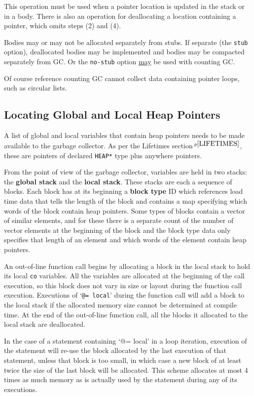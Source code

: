 \documentclass[12pt]{article}
\newcommand{\key}[1]{{\rm \bfseries #1}}
\newcommand{\pagnote}[1]{$\,^{p\pageref{#1}}$}
\begin{document}
This operation must be used when a pointer location is updated
in the stack or in a body.  There is also an operation for
deallocating a location containing a pointer, which omits steps
(2) and (4).

Bodies may or may not be allocated separately from stubs.
If separate (the {\tt stub} option),
deallocated bodies may be implemented and
bodies may be compacted separately from GC.
Or the {\tt no-stub} option \underline{may} be used with
counting GC.

Of course reference counting GC cannot collect data containing
pointer loops, such as circular lists.

\subsection{Locating Global and Local Heap Pointers}

A list of global and local variables that contain heap
pointers needs to be made available to the garbage collector.
As per the Lifetimes section\pagnote{LIFETIMES}, these are
pointers of declared {\tt *HEAP*} type plus anywhere pointers.

From the point of view of the garbage collector, variables
are held in two stacks: the \key{global stack}\label{GLOBAL-STACK} and
the \key{local stack}\label{LOCAL-STACK}.  These
stacks are each a sequence of blocks.  Each block has at its
beginning a \key{block type} ID which references load time data that tells
the length of the block and contains a map specifying which words of the block
contain heap pointers.  Some types of blocks contain a vector
of similar elements, and for these there is a separate count of the number of
vector elements at the beginning of the block and the block type data
only specifies that length of an element and
which words of the element contain heap pointers.

An out-of-line function call\label{OUT-OF-LINE-LOCALS}
begins by allocating a block in the
local stack to hold
its local {\tt co} variables.  All the variables are allocated
at the beginning of the call execution, so this block does not vary
in size or layout during the function call execution.  Executions
of `{\tt @= local}' during the function call will add a block to the
local stack if the allocated memory size cannot be determined at
compile time.  At the end of the out-of-line function call, all
the blocks it allocated to the local stack are deallocated.

In the case of a statement containing `{@= local}' in a
loop iteration, execution of the statement will re-use the block
allocated by the last execution of that statement, unless that block
is too small, in which case a new block of at least twice the size
of the last block will be allocated.  This scheme allocates at most
4 times as much memory as is actually used by the statement during
any of its executions.
\end{document}
